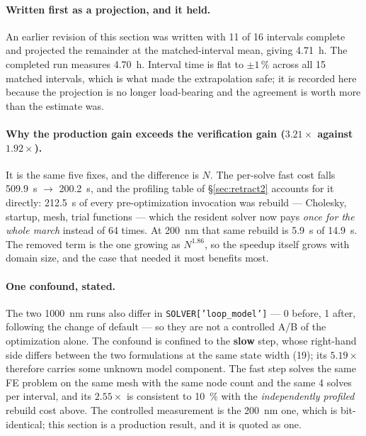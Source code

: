 \documentclass[11pt]{article}
\begin{document}
\paragraph{Written first as a projection, and it held.} An earlier revision of
this section was written with 11 of 16 intervals complete and projected the
remainder at the matched-interval mean, giving \SI{4.71}{\hour}. The completed
run measures \SI{4.70}{\hour}. Interval time is flat to $\pm1\,\%$ across all
15 matched intervals, which is what made the extrapolation safe; it is recorded
here because the projection is no longer load-bearing and the agreement is
worth more than the estimate was.

\paragraph{Why the production gain exceeds the verification gain
($3.21\times$ against $1.92\times$).} It is the same five fixes, and the
difference is $N$. The per-solve fast cost falls \SI{509.9}{\second}
$\rightarrow$ \SI{200.2}{\second}, and the profiling table of
\S\ref{sec:retract2} accounts for it directly: \SI{212.5}{\second} of every
pre-optimization invocation was rebuild --- Cholesky, startup, mesh, trial
functions --- which the resident solver now pays \emph{once for the whole
march} instead of 64 times. At \SI{200}{\nano\meter} that same rebuild is
\SI{5.9}{\second} of \SI{14.9}{\second}. The removed term is the one growing
as $N^{1.86}$, so the speedup itself grows with domain size, and the case that
needed it most benefits most.

\paragraph{One confound, stated.} The two \SI{1000}{\nano\meter} runs also
differ in \texttt{SOLVER['loop\_model']} --- 0 before, 1 after, following the
change of default --- so they are not a controlled A/B of the optimization
alone. The confound is confined to the \textbf{slow} step, whose right-hand
side differs between the two formulations at the same state width (19); its
$5.19\times$ therefore carries some unknown model component. The fast step
solves the same FE problem on the same mesh with the same node count and the
same 4 solves per interval, and its $2.55\times$ is consistent to
\SI{10}{\percent} with the \emph{independently profiled} rebuild cost above.
The controlled measurement is the \SI{200}{\nano\meter} one, which is
bit-identical; this section is a production result, and it is quoted as one.
\end{document}
